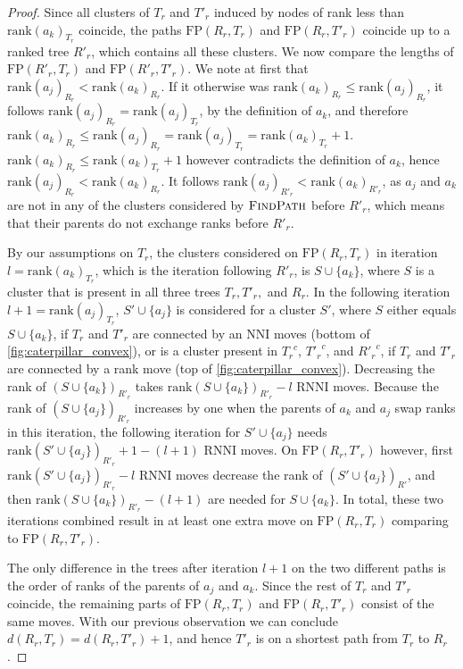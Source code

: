 \documentclass[11pt]{amsart}
\newcommand{\rnni}{\mathrm{RNNI}}
\newcommand{\findpath}{\textsc{FindPath}}
\newcommand{\rank}{\mathrm{rank}}
\newcommand{\nni}{\mathrm{NNI}}
\newcommand{\fp}{\mathrm{FP}}
\begin{document}
\begin{proof}
	Since all clusters of $T_r$ and $T'_r$ induced by nodes of rank less than $\rank(a_k)_{T_r}$ coincide, the paths $\fp(R_r,T_r)$ and $\fp(R_r,T'_r)$ coincide up to a ranked tree $R'_r$, which contains all these clusters.
	We now compare the lengths of $\fp(R'_r,T_r)$ and $\fp(R'_r,T'_r)$.
	We note at first that $\rank(a_j)_{R_r} < \rank(a_k)_{R_r}$.
	If it otherwise was $\rank(a_k)_{R_r} \leq \rank(a_j)_{R_r}$, it follows $\rank(a_j)_{R_r} = \rank(a_j)_{T_r}$, by the definition of $a_k$, and therefore  $\rank(a_k)_{R_r} \leq \rank(a_j)_{R_r} = \rank(a_j)_{T_r} = \rank(a_k)_{T_r} + 1$.
	$\rank(a_k)_{R_r} \leq \rank(a_k)_{T_r} + 1$ however contradicts the definition of $a_k$, hence $\rank(a_j)_{R_r} < \rank(a_k)_{R_r}$.
	It follows $\rank(a_j)_{R'_r} < \rank(a_k)_{R'_r}$, as $a_j$ and $a_k$ are not in any of the clusters considered by $\findpath$ before $R'_r$, which means that their parents do not exchange ranks before $R'_r$.

	By our assumptions on $T_r$, the clusters considered on $\fp(R_r,T_r)$ in iteration $l = \rank(a_k)_{T_r}$, which is the iteration following $R'_r$, is $S \cup \{a_k\}$, where $S$ is a cluster that is present in all three trees $T_r, T'_r,$ and $R_r$.
	In the following iteration $l+1 = \rank(a_j)_{T_r}$, $S' \cup \{a_j\}$ is considered for a cluster $S'$, where $S$ either equals $S \cup \{a_k\}$, if $T_r$ and $T'_r$ are connected by an $\nni$ moves (bottom of \autoref{fig:caterpillar_convex}), or is a cluster present in ${T_r}^c$, ${T'_r}^c$, and ${R'_r}^c$, if $T_r$ and $T'_r$ are connected by a rank move (top of \autoref{fig:caterpillar_convex}).
	Decreasing the rank of $(S \cup \{a_k\})_{R'_r}$ takes $\rank(S \cup \{a_k\})_{R'_r} - l$ $\rnni$ moves.
	Because the rank of $(S \cup \{a_j\})_{R'_r}$ increases by one when the parents of $a_k$ and $a_j$ swap ranks in this iteration, the following iteration for $S' \cup \{a_j\}$ needs $\rank(S' \cup \{a_j\})_{R'_r} + 1 - (l+1)$ $\rnni$ moves.
	On $\fp(R_r,T'_r)$ however, first $\rank(S' \cup \{a_j\})_{R'_r} - l$ $\rnni$ moves decrease the rank of $(S' \cup \{a_j\})_{R'}$, and then $\rank(S \cup \{a_k\})_{R'_r} - (l+1)$ are needed for $S \cup \{a_k\}$.
	In total, these two iterations combined result in at least one extra move on $\fp(R_r, T_r)$ comparing to $\fp(R_r, T'_r)$.

	The only difference in the trees after iteration $l+1$ on the two different paths is the order of ranks of the parents of $a_j$ and $a_k$.
	Since the rest of $T_r$ and $T'_r$ coincide, the remaining parts of $\fp(R_r, T_r)$ and $\fp(R_r, T'_r)$ consist of the same moves.
	With our previous observation we can conclude $d(R_r,T_r) = d(R_r,T'_r) + 1$, and hence $T'_r$ is on a shortest path from $T_r$ to $R_r$.
\end{proof}
\end{document}
